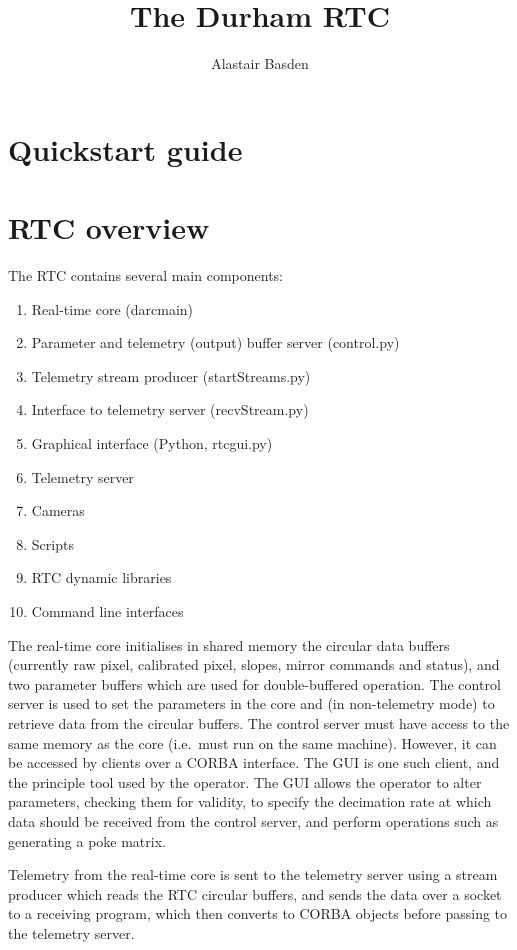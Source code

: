 \documentclass[a4,10pt]{article}
\title{The Durham RTC}
\author{Alastair Basden}
\begin{document}
\maketitle
\section{Quickstart guide}



\section{RTC overview}
The RTC contains several main components:
\begin{enumerate}
\item Real-time core (darcmain)
\item Parameter and telemetry (output) buffer server (control.py)
\item Telemetry stream producer (startStreams.py)
\item Interface to telemetry server (recvStream.py)
\item Graphical interface (Python, rtcgui.py)
\item Telemetry server
\item Cameras
\item Scripts 
\item RTC dynamic libraries
\item Command line interfaces
\end{enumerate}

The real-time core initialises in shared memory the circular data
buffers (currently raw pixel, calibrated pixel, slopes, mirror
commands and status), and two parameter buffers which are used for
double-buffered operation.  The control server is used to set the
parameters in the core and (in non-telemetry mode) to retrieve data from the circular buffers.
The control server must have access to the same memory as the core
(i.e.\ must run on the same machine).  However, it can be accessed by
clients over a CORBA interface.  The GUI is one such client, and the
principle tool used by the operator.  The GUI allows the operator to
alter parameters, checking them for validity, to specify the
decimation rate at which data should be received from the control
server, and perform operations such as generating a poke matrix.

Telemetry from the real-time core is sent to the telemetry server
using a stream producer which reads the RTC circular buffers, and
sends the data over a socket to a receiving program, which then
converts to CORBA objects before passing to the telemetry server.
\end{document}
